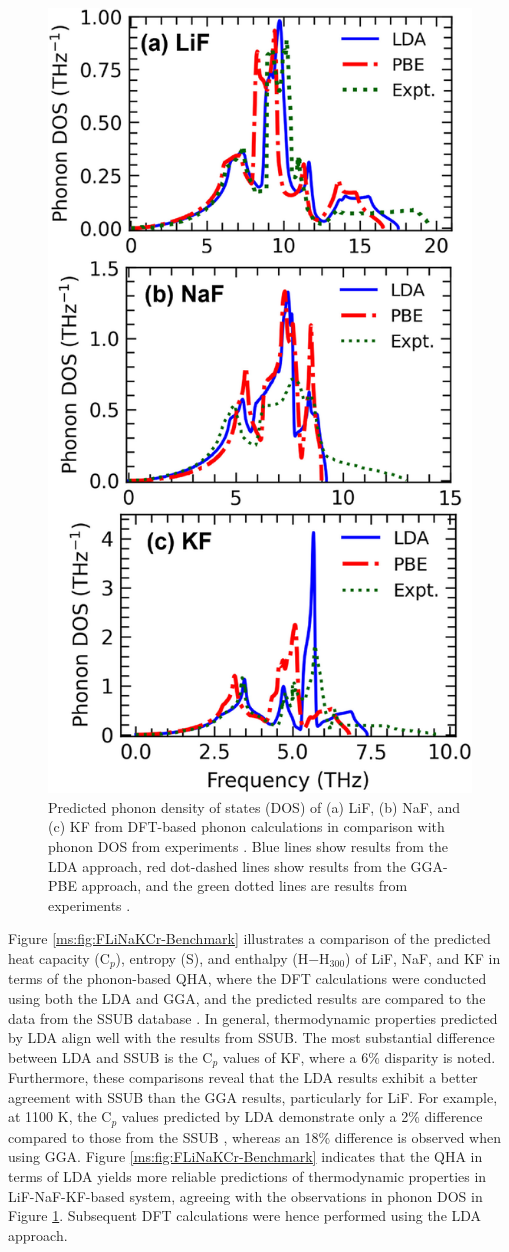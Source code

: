 \begin{figure}[H]
    \centering
    \includegraphics[width=0.5\linewidth]{moltensalts/Moltensalts-FLiNaKCr-PhononDOS.jpg}
    \caption{Predicted phonon density of states (DOS) of (a) LiF, (b) NaF, and (c) KF from DFT-based phonon calculations in comparison with phonon DOS from experiments \cite{dolling1968lattice, buhrer1970lattice, karo1969lattice}. Blue lines show results from the LDA approach, red dot-dashed lines show results from the GGA-PBE approach, and the green dotted lines are results from experiments \cite{dolling1968lattice, buhrer1970lattice, karo1969lattice}. }
    \label{ms:fig:FLiNaKCrphonon}
\end{figure}

Figure \ref{ms:fig:FLiNaKCr-Benchmark} illustrates a comparison of the predicted heat capacity (C$_p$), entropy (S), and enthalpy (H$-$H$_{300}$) of LiF, NaF, and KF in terms of the phonon-based QHA, where the DFT calculations were conducted using both the LDA and GGA, and the predicted results are compared to the data from the SSUB database \cite{sgteurl}. In general, thermodynamic properties predicted by LDA align well with the results from SSUB. The most substantial difference between LDA and SSUB is the C$_p$ values of KF, where a 6\% disparity is noted. Furthermore, these comparisons reveal that the LDA results exhibit a better agreement with SSUB than the GGA results, particularly for LiF. For example, at 1100 K, the C$_p$ values predicted by LDA demonstrate only a 2\% difference compared to those from the SSUB \cite{sgteurl}, whereas an 18\% difference is observed when using GGA. Figure \ref{ms:fig:FLiNaKCr-Benchmark} indicates that the QHA in terms of LDA yields more reliable predictions of thermodynamic properties in LiF-NaF-KF-based system, agreeing with the observations in phonon DOS in Figure \ref{ms:fig:FLiNaKCrphonon}. Subsequent DFT calculations were hence performed using the LDA approach. 

